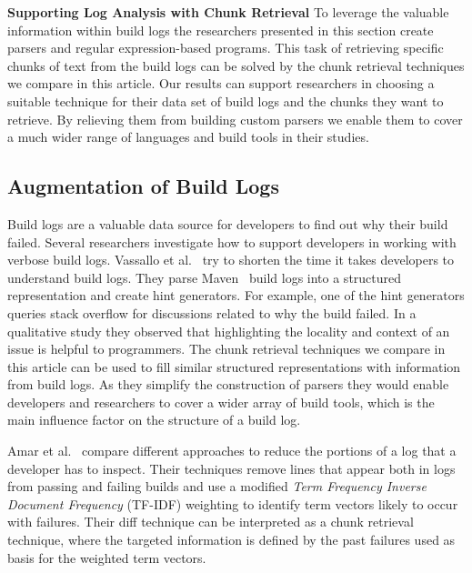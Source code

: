 \noindent
\textbf{Supporting Log Analysis with Chunk Retrieval}
To leverage the valuable information within build logs the researchers
presented in this section create parsers and regular expression-based
programs. This task of retrieving specific chunks of text from the
build logs can be solved by the chunk retrieval techniques we compare
in this article. Our results can support researchers in choosing a
suitable technique for their data set of build logs and the chunks
they want to retrieve. By relieving them from building custom parsers
we enable them to cover a much wider range of languages and build
tools in their studies.


\subsection{Augmentation of Build Logs}
\label{sec:rw-bl-analysis}
Build logs are a valuable data source for developers to find out why
their build failed. Several researchers investigate how to support
developers in working with verbose build logs. Vassallo et
al.~\cite{vassallo2018un-break} try to shorten the time it takes
developers to understand build logs. They parse
Maven~\cite{maven2019website} build logs into a structured
representation and create hint generators.
For example, one of the hint generators queries stack overflow for
discussions related to why the build failed. In a qualitative study
they observed that highlighting the locality and context of an issue
is helpful to programmers.
The chunk retrieval techniques we compare in this article can be used
to fill similar structured representations with information from build
logs. As they simplify the construction of parsers they would enable
developers and researchers to cover a wider array of build tools,
which is the main influence factor on the structure of a build log.

Amar et al.~\cite{amar2019mining} compare different approaches to
reduce the portions of a log that a developer has to inspect. Their
techniques remove lines that appear both in logs from passing and
failing builds and use a modified \emph{Term Frequency Inverse
Document Frequency} (TF-IDF) weighting to identify term vectors likely
to occur with failures. Their diff technique can be interpreted as a
chunk retrieval technique, where the targeted information is defined
by the past failures used as basis for the weighted term vectors.


